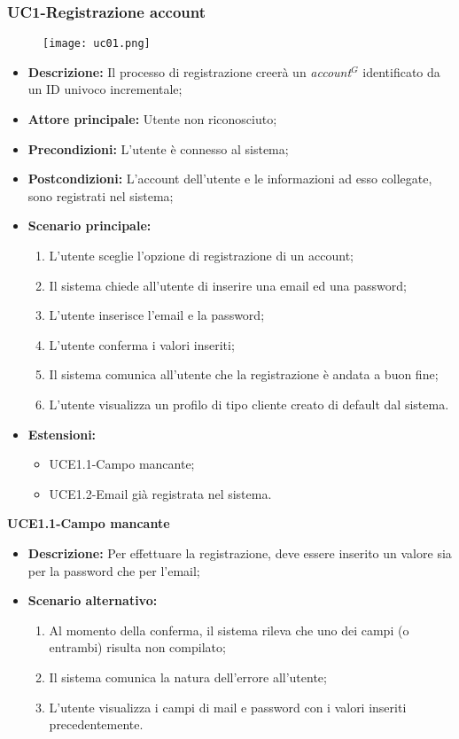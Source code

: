 \subsubsection{UC1-Registrazione account}
\begin{figure}[h] \texttt{[image: uc01.png]} \end{figure}
\begin{itemize}
    \item \textbf{Descrizione:} Il processo di registrazione creerà un \emph{account}$^{G}$ identificato da un ID univoco incrementale;
    \item \textbf{Attore principale:} Utente non riconosciuto;
    \item \textbf{Precondizioni:} L'utente è connesso al sistema;
    \item \textbf{Postcondizioni:} L'account dell'utente e le informazioni ad esso collegate, sono registrati nel sistema;
    \item \textbf{Scenario principale:}
        \begin{enumerate}
            \item L'utente sceglie l'opzione di registrazione di un account;
            \item Il sistema chiede all'utente di inserire una email ed una password;
            \item L'utente inserisce l'email e la password;
            \item L'utente conferma i valori inseriti;
            \item Il sistema comunica all'utente che la registrazione è andata a buon fine;
            \item L'utente visualizza un profilo di tipo cliente creato di default dal sistema.
        \end{enumerate}
    \item \textbf{Estensioni:}
        \begin{itemize}
                \item UCE1.1-Campo mancante;
                \item UCE1.2-Email già registrata nel sistema.
        \end{itemize}
\end{itemize}

\textbf{UCE1.1-Campo mancante}
\begin{itemize}
    \item \textbf{Descrizione:} Per effettuare la registrazione, deve essere inserito un valore sia per la password che per l'email;
    \item \textbf{Scenario alternativo:}
    \begin{enumerate}
        \item Al momento della conferma, il sistema rileva che uno dei campi (o entrambi) risulta non compilato;
        \item Il sistema comunica la natura dell'errore all'utente;
        \item L'utente visualizza i campi di mail e password con i valori inseriti precedentemente.
    \end{enumerate}
\end{itemize}

